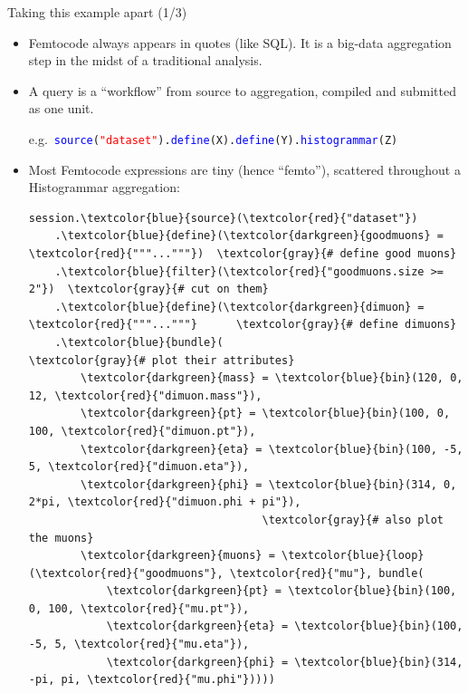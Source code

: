 \documentclass{beamer}
\begin{document}
\begin{frame}[fragile]{Taking this example apart (1/3)}
\vspace{0.25 cm}
\begin{itemize}
\item Femtocode always appears in quotes (like SQL). It is a big-data aggregation step in the midst of a traditional analysis.

\item A query is a ``workflow'' from source to aggregation, compiled and submitted as one unit.

e.g.\ {\tt\scriptsize \textcolor{blue}{source}(\textcolor{red}{"dataset"}).\textcolor{blue}{define}(X).\textcolor{blue}{define}(Y).\textcolor{blue}{histogrammar}(Z) }

\item Most Femtocode expressions are tiny (hence ``femto''), scattered throughout a Histogrammar aggregation:

\scriptsize
\begin{Verbatim}[commandchars=\\\{\}]
session.\textcolor{blue}{source}(\textcolor{red}{"dataset"})
    .\textcolor{blue}{define}(\textcolor{darkgreen}{goodmuons} = \textcolor{red}{"""..."""})  \textcolor{gray}{# define good muons}
    .\textcolor{blue}{filter}(\textcolor{red}{"goodmuons.size >= 2"})  \textcolor{gray}{# cut on them}
    .\textcolor{blue}{define}(\textcolor{darkgreen}{dimuon} = \textcolor{red}{"""..."""}      \textcolor{gray}{# define dimuons}
    .\textcolor{blue}{bundle}(                        \textcolor{gray}{# plot their attributes}
        \textcolor{darkgreen}{mass} = \textcolor{blue}{bin}(120, 0, 12, \textcolor{red}{"dimuon.mass"}),
        \textcolor{darkgreen}{pt} = \textcolor{blue}{bin}(100, 0, 100, \textcolor{red}{"dimuon.pt"}),
        \textcolor{darkgreen}{eta} = \textcolor{blue}{bin}(100, -5, 5, \textcolor{red}{"dimuon.eta"}),
        \textcolor{darkgreen}{phi} = \textcolor{blue}{bin}(314, 0, 2*pi, \textcolor{red}{"dimuon.phi + pi"}),
                                    \textcolor{gray}{# also plot the muons}
        \textcolor{darkgreen}{muons} = \textcolor{blue}{loop}(\textcolor{red}{"goodmuons"}, \textcolor{red}{"mu"}, bundle(
            \textcolor{darkgreen}{pt} = \textcolor{blue}{bin}(100, 0, 100, \textcolor{red}{"mu.pt"}),
            \textcolor{darkgreen}{eta} = \textcolor{blue}{bin}(100, -5, 5, \textcolor{red}{"mu.eta"}),
            \textcolor{darkgreen}{phi} = \textcolor{blue}{bin}(314, -pi, pi, \textcolor{red}{"mu.phi"}))))
\end{Verbatim}
\end{itemize}
\end{frame}
\end{document}
